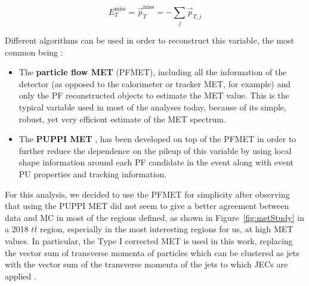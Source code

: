 \documentclass[a4paper, 10pt, openright]{report}
\begin{document}
\begin{equation}
\label{eq:MET}
E_{T}^{\text{miss}} = \overrightarrow{p}_T^{\text{miss}} = - \sum_j \overrightarrow{p}_{T, j}
\end{equation}

Different algorithms can be used in order to reconstruct this variable, the most common being \cite{METReco}:
\begin{itemize}
\item The \textbf{particle flow \ac{MET}} (PFMET), including all the information of the detector (as opposed to the calorimeter or tracker \ac{MET}, for example) and only the \ac{PF} reconstructed objects to estimate the \ac{MET} value. This is the typical variable used in most of the analyses today, because of its simple, robust, yet very efficient estimate of the \ac{MET} spectrum.
\item The \textbf{\ac{PUPPI} \ac{MET}} \cite{PUPPI}, has been developed on top of the PFMET in order to further reduce the dependence on the pileup of this variable by using local shape information around each \ac{PF} candidate in the event along with event \ac{PU} properties and tracking information. %
\end{itemize}

For this analysis, we decided to use the PFMET for simplicity after observing that using the \ac{PUPPI} \ac{MET} did not seem to give a better agreement between data and \ac{MC} in most of the regions defined, as shown in Figure~\ref{fig:metStudy} in a 2018 $t \bar t$ region, especially in the most interesting regions for us, at high \ac{MET} values. In particular, the Type I corrected \ac{MET} is used in this work, replacing the vector sum of transverse momenta of particles which can be clustered as jets with the vector sum of the transverse momenta of the jets to which \acp{JEC} are applied \cite{METTwiki}.
\end{document}
